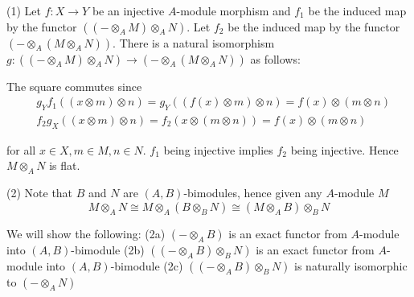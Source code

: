 \begin{longproof}
	(1) Let $f: X \to Y$ be an injective $A$-module morphism and $f_1$ be the induced map by the functor $((- \otimes_A M) \otimes_A N)$. Let $f_2$ be the induced map by the functor $(- \otimes_A (M \otimes_A N))$. There is a natural isomorphism $g: ((- \otimes_A M) \otimes_A N) \to (- \otimes_A (M \otimes_A N))$ as follows:
		
	\begin{center}
	\end{center}
	
	The square commutes since
	\begin{align*}
		&g_Y f_1((x \otimes m) \otimes n) = g_Y((f(x) \otimes m) \otimes n) = f(x) \otimes (m \otimes n) \\
		&f_2 g_X((x \otimes m) \otimes n) = f_2(x \otimes (m \otimes n)) = f(x) \otimes (m \otimes n)
	\end{align*}
	
	for all $x \in X, m \in M, n \in N$. $f_1$ being injective implies $f_2$ being injective. Hence $M \otimes_A N$ is flat.
	
	(2) Note that $B$ and $N$ are $(A,B)$-bimodules, hence given any $A$-module $M$
	$$
		M \otimes_A N \cong M \otimes_A (B \otimes_B N) \cong (M \otimes_A B) \otimes_B N
	$$
	
	
	We will show the following: (2a) $(- \otimes_A B)$ is an exact functor from $A$-module into $(A,B)$-bimodule (2b) $((- \otimes_A B) \otimes_B N)$ is an exact functor from $A$-module into $(A,B)$-bimodule (2c) $((- \otimes_A B) \otimes_B N)$ is naturally isomorphic to $(- \otimes_A N)$
	

\end{longproof}
